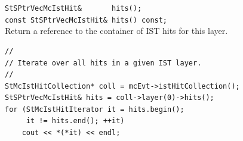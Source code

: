 \begin{Entry}
    \verb+StSPtrVecMcIstHit&       hits();+\\
    \verb+const StSPtrVecMcIstHit& hits() const;+\\
    Return a reference to the container of IST hits for this layer.

\item[Examples]
{\footnotesize
\begin{verbatim}
//
// Iterate over all hits in a given IST layer.
//
StMcIstHitCollection* coll = mcEvt->istHitCollection();
StSPtrVecMcIstHit& hits = coll->layer(0)->hits();
for (StMcIstHitIterator it = hits.begin();
     it != hits.end(); ++it)
    cout << *(*it) << endl;
\end{verbatim}
}%
\end{Entry}
\clearpage

%
%
